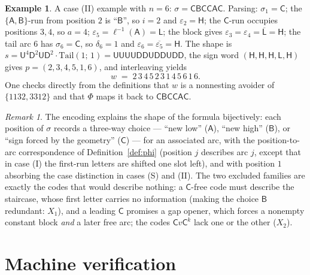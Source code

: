 \documentclass[11pt]{article}
\theoremstyle{definition}
\newtheorem{example}[theorem]{Example}
\theoremstyle{remark}
\newtheorem{remark}[theorem]{Remark}
\newcommand{\sU}{\mathsf{U}}
\newcommand{\sD}{\mathsf{D}}
\newcommand{\sL}{\mathsf{L}}
\newcommand{\sH}{\mathsf{H}}
\newcommand{\sA}{\mathsf{A}}
\newcommand{\sB}{\mathsf{B}}
\newcommand{\sC}{\mathsf{C}}
\begin{document}
\begin{example}\label{ex:cbccac}
A case (II) example with $n=6$: $\sigma=\sC\sB\sC\sC\sA\sC$. Parsing:
$\sigma_1=\sC$; the $\{\sA,\sB\}$-run from position $2$ is ``$\sB$'', so
$i=2$ and $\varepsilon_2=\sH$; the $\sC$-run occupies positions $3,4$, so
$a=4$; $\varepsilon_5=\ell^{-1}(\sA)=\sL$; the block gives
$\varepsilon_3=\varepsilon_4=\overline{\sL}=\sH$; the tail arc $6$ has
$\sigma_6=\sC$, so $\delta_6=1$ and
$\varepsilon_6=\overline{\varepsilon_5}=\sH$. The shape is
$s=\sU^4\sD^2\sU\sD^2\cdot\mathrm{Tail}(1;\,1)
 =\sU\sU\sU\sU\sD\sD\sU\sD\sD\sU\sD\sD$, the sign word
$(\sH,\sH,\sH,\sL,\sH)$ gives $p=(2,3,4,5,1,6)$, and interleaving yields
\[
  w \;=\; 2\,3\,4\,5\,2\,3\,1\,4\,5\,6\,1\,6 .
\]
One checks directly from the definitions that $w$ is a nonnesting avoider
of $\{1132,3312\}$ and that $\Phi$ maps it back to $\sC\sB\sC\sC\sA\sC$.
\end{example}

\begin{remark}
The encoding explains the shape of the formula bijectively: each position
of $\sigma$ records a three-way choice --- ``new low''
($\sA$), ``new high'' ($\sB$), or ``sign forced by the geometry'' ($\sC$)
--- for an associated arc, with the position-to-arc correspondence of
Definition~\ref{def:phi} (position $j$ describes arc $j$, except that in
case (I) the first-run letters are shifted one slot left), and with
position $1$ absorbing the case distinction in cases (S) and (II). The two excluded
families are exactly the codes that would describe nothing: a $\sC$-free
code must describe the staircase, whose first letter carries no information
(making the choice $\sB$ redundant: $X_1$), and a leading $\sC$ promises a
gap opener, which forces a nonempty constant block \emph{and} a later free
arc; the codes $\sC v\sC^k$ lack one or the other ($X_2$).
\end{remark}

\appendix

\section{Machine verification}\label{app:verification}
\end{document}

